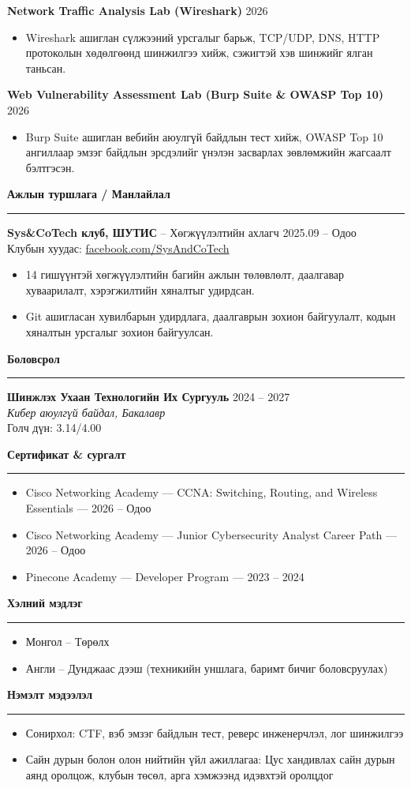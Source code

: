 \documentclass[10pt,a4paper]{article}
\newcommand{\cvsection}[1]{
  \vspace{3pt}
  {\large\textbf{#1}}\\[-4pt]
  \rule{\linewidth}{0.4pt}
}
\begin{document}
\textbf{Network Traffic Analysis Lab (Wireshark)} \hfill 2026\\
\begin{itemize}
  \item Wireshark ашиглан сүлжээний урсгалыг барьж, TCP/UDP, DNS, HTTP протоколын хөдөлгөөнд шинжилгээ хийж, сэжигтэй хэв шинжийг ялган таньсан.
\end{itemize}

\textbf{Web Vulnerability Assessment Lab (Burp Suite \& OWASP Top 10)} \hfill 2026\\
\begin{itemize}
  \item Burp Suite ашиглан вебийн аюулгүй байдлын тест хийж, OWASP Top 10 ангиллаар эмзэг байдлын эрсдэлийг үнэлэн засварлах зөвлөмжийн жагсаалт бэлтгэсэн.
\end{itemize}

\cvsection{Ажлын туршлага / Манлайлал}
\textbf{Sys\&CoTech клуб, ШУТИС} -- Хөгжүүлэлтийн ахлагч \hfill 2025.09 -- Одоо\\
Клубын хуудас: \href{https://www.facebook.com/SysAndCoTech/}{facebook.com/SysAndCoTech}\\
\begin{itemize}
  \item 14 гишүүнтэй хөгжүүлэлтийн багийн ажлын төлөвлөлт, даалгавар хуваарилалт, хэрэгжилтийн хяналтыг удирдсан.
  \item Git ашигласан хувилбарын удирдлага, даалгаврын зохион байгуулалт, кодын хяналтын урсгалыг зохион байгуулсан.
\end{itemize}

\cvsection{Боловсрол}
\textbf{Шинжлэх Ухаан Технологийн Их Сургууль} \hfill 2024 -- 2027\\
\textit{Кибер аюулгүй байдал, Бакалавр}\\
Голч дүн: 3.14/4.00

\cvsection{Сертификат \& сургалт}
\begin{itemize}
  \item Cisco Networking Academy --- CCNA: Switching, Routing, and Wireless Essentials --- 2026 -- Одоо
  \item Cisco Networking Academy --- Junior Cybersecurity Analyst Career Path --- 2026 -- Одоо
  \item Pinecone Academy --- Developer Program --- 2023 -- 2024
\end{itemize}

\cvsection{Хэлний мэдлэг}
\begin{itemize}
  \item Монгол -- Төрөлх
  \item Англи -- Дунджаас дээш (техникийн уншлага, баримт бичиг боловсруулах)
\end{itemize}

\cvsection{Нэмэлт мэдээлэл}
\begin{itemize}
  \item Сонирхол: CTF, вэб эмзэг байдлын тест, реверс инженерчлэл, лог шинжилгээ
  \item Сайн дурын болон олон нийтийн үйл ажиллагаа: Цус хандивлах сайн дурын аянд оролцож, клубын төсөл, арга хэмжээнд идэвхтэй оролцдог
\end{itemize}
\end{document}
